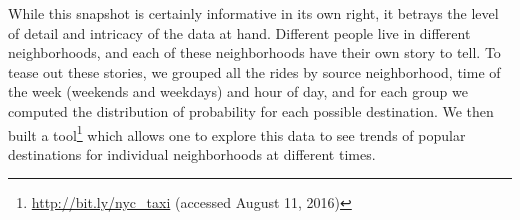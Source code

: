 \documentclass[twocolumn]{article}
\begin{document}
While this snapshot is certainly informative in its own right, it betrays the level of detail and intricacy of the data at hand. Different people live in different neighborhoods, and each of these neighborhoods have their own story to tell. To tease out these stories, we grouped all the rides by source neighborhood, time of the week (weekends and weekdays) and hour of day, and for each group we computed the distribution of probability for each possible destination. We then built a tool\footnote{\href{http://bit.ly/nyc_taxi}{http://bit.ly/nyc\_taxi} (accessed August 11, 2016)} which allows one to explore this data to see trends of popular destinations for individual neighborhoods at different times. 


\begin{figure}[t]
 

\end{figure}
\end{document}
